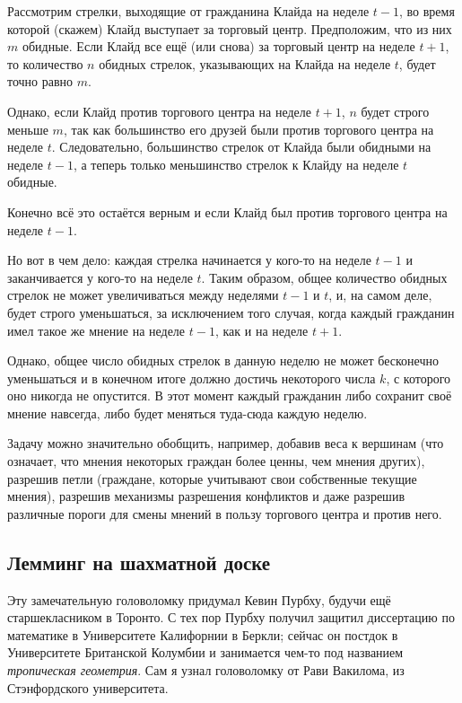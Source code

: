 Рассмотрим стрелки, выходящие от гражданина Клайда на неделе $t - 1$, во время которой (скажем) Клайд выступает за торговый центр.
Предположим, что из них $m$ обидные.
Если Клайд все ещё (или снова) за торговый центр на неделе $t + 1$, то количество $n$ обидных стрелок, указывающих на Клайда на неделе $t$, будет точно равно $m$.

Однако, если Клайд против торгового центра на неделе $t + 1$, $n$ будет строго меньше $m$, так как большинство его друзей были против торгового центра на неделе $t$.
Следовательно, большинство стрелок от Клайда были обидными на неделе $t - 1$, а теперь только меньшинство стрелок к Клайду на неделе $t$ обидные.

Конечно всё это остаётся верным и если Клайд был против торгового центра на неделе $t - 1$.

Но вот в чем дело: каждая стрелка начинается у кого-то на неделе $t - 1$ и заканчивается у кого-то на неделе $t$. Таким образом, общее количество обидных стрелок не может увеличиваться между неделями $t - 1$ и $t$, и, на самом деле, будет строго уменьшаться, за исключением того случая, когда каждый гражданин имел такое же мнение на неделе $t - 1$, как и на неделе $t + 1$.

Однако, общее число обидных стрелок в данную неделю не может бесконечно уменьшаться и в конечном итоге должно достичь некоторого числа $k$, с которого оно никогда не опустится.
В этот момент каждый гражданин либо сохранит своё мнение навсегда, либо будет меняться туда-сюда каждую неделю.

Задачу можно значительно обобщить, например, добавив веса к вершинам (что означает, что мнения некоторых граждан более ценны, чем мнения других), разрешив петли (граждане, которые учитывают свои собственные текущие мнения), разрешив механизмы разрешения конфликтов и даже разрешив различные пороги для смены мнений в пользу торгового центра и против него.

\subsection*{Лемминг на шахматной доске}

Эту замечательную головоломку придумал Кевин Пурбху, будучи ещё старшекласником в Торонто.
С тех пор Пурбху получил защитил диссертацию по математике в Университете Калифорнии в Беркли;
сейчас он постдок в Университете Британской Колумбии
и занимается чем-то под названием \emph{тропическая геометрия}.
Сам я узнал головоломку от Рави Вакилома, из Стэнфордского университета.

